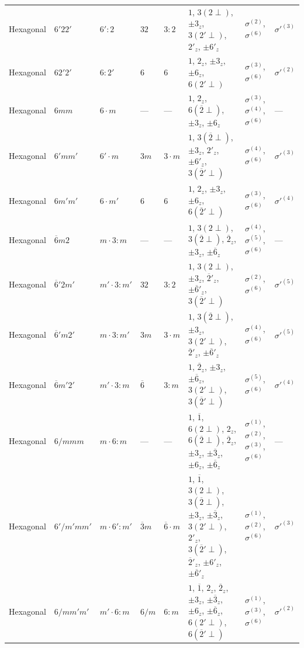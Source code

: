 \documentclass[a4paper,11pt]{article}
\newcommand{\ob}[1]{\overline{#1}}
\newcommand{\sg}[1]{\sigma^{(#1)}}
\newcommand{\sgp}[1]{\sigma'^{(#1)}}
\begin{document}
\begin{landscape}
\begin{longtable}{l l l l l p{9.5cm} l l}
Hexagonal & $6'22'$ & $6'{:}2$ & $32$ & $3{:}2$ & $1$, $3(2{\perp})$, $\pm 3_z$, $3(2'{\perp})$, $2'_z$, $\pm 6'_z$ & $\sg{2}$, $\sg{6}$ & $\sgp{3}$ \\
Hexagonal & $62'2'$ & $6{:}2'$ & $6$ & $6$ & $1$, $2_z$, $\pm 3_z$, $\pm 6_z$, $6(2'{\perp})$ & $\sg{3}$, $\sg{6}$ & $\sgp{2}$ \\
Hexagonal & $6mm$ & $6{\cdot}m$ & --- & --- & $1$, $2_z$, $6(\ob{2}{\perp})$, $\pm 3_z$, $\pm 6_z$ & $\sg{3}$, $\sg{4}$, $\sg{6}$ & --- \\
Hexagonal & $6'mm'$ & $6'{\cdot}m$ & $3m$ & $3{\cdot}m$ & $1$, $3(\ob{2}{\perp})$, $\pm 3_z$, $2'_z$, $\pm 6'_z$, $3(\ob{2}'{\perp})$ & $\sg{4}$, $\sg{6}$ & $\sgp{3}$ \\
Hexagonal & $6m'm'$ & $6{\cdot}m'$ & $6$ & $6$ & $1$, $2_z$, $\pm 3_z$, $\pm 6_z$, $6(\ob{2}'{\perp})$ & $\sg{3}$, $\sg{6}$ & $\sgp{4}$ \\
Hexagonal & $\ob{6}m2$ & $m{\cdot}3{:}m$ & --- & --- & $1$, $3(2{\perp})$, $3(\ob{2}{\perp})$, $\ob{2}_z$, $\pm 3_z$, $\pm\ob{6}_z$ & $\sg{4}$, $\sg{5}$, $\sg{6}$ & --- \\
Hexagonal & $\ob{6}'2m'$ & $m'{\cdot}3{:}m'$ & $32$ & $3{:}2$ & $1$, $3(2{\perp})$, $\pm 3_z$, $\ob{2}'_z$, $\pm\ob{6}'_z$, $3(\ob{2}'{\perp})$ & $\sg{2}$, $\sg{6}$ & $\sgp{5}$ \\
Hexagonal & $\ob{6}'m2'$ & $m{\cdot}3{:}m'$ & $3m$ & $3{\cdot}m$ & $1$, $3(\ob{2}{\perp})$, $\pm 3_z$, $3(2'{\perp})$, $\ob{2}'_z$, $\pm\ob{6}'_z$ & $\sg{4}$, $\sg{6}$ & $\sgp{5}$ \\
Hexagonal & $\ob{6}m'2'$ & $m'{\cdot}3{:}m$ & $\ob{6}$ & $3{:}m$ & $1$, $\ob{2}_z$, $\pm 3_z$, $\pm\ob{6}_z$, $3(2'{\perp})$, $3(\ob{2}'{\perp})$ & $\sg{5}$, $\sg{6}$ & $\sgp{4}$ \\
Hexagonal & $6/mmm$ & $m{\cdot}6{:}m$ & --- & --- & $1$, $\ob{1}$, $6(2{\perp})$, $2_z$, $6(\ob{2}{\perp})$, $\ob{2}_z$, $\pm 3_z$, $\pm\ob{3}_z$, $\pm 6_z$, $\pm\ob{6}_z$ & $\sg{1}$, $\sg{2}$, $\sg{3}$, $\sg{6}$ & --- \\
Hexagonal & $6'/m'mm'$ & $m{\cdot}6'{:}m'$ & $\ob{3}m$ & $\ob{6}{\cdot}m$ & $1$, $\ob{1}$, $3(2{\perp})$, $3(\ob{2}{\perp})$, $\pm 3_z$, $\pm\ob{3}_z$, $3(2'{\perp})$, $2'_z$, $3(\ob{2}'{\perp})$, $\ob{2}'_z$, $\pm 6'_z$, $\pm\ob{6}'_z$ & $\sg{1}$, $\sg{2}$, $\sg{6}$ & $\sgp{3}$ \\
Hexagonal & $6/mm'm'$ & $m'{\cdot}6{:}m$ & $6/m$ & $6{:}m$ & $1$, $\ob{1}$, $2_z$, $\ob{2}_z$, $\pm 3_z$, $\pm\ob{3}_z$, $\pm 6_z$, $\pm\ob{6}_z$, $6(2'{\perp})$, $6(\ob{2}'{\perp})$ & $\sg{1}$, $\sg{3}$, $\sg{6}$ & $\sgp{2}$ \\

\end{longtable}
\end{landscape}
\end{document}

